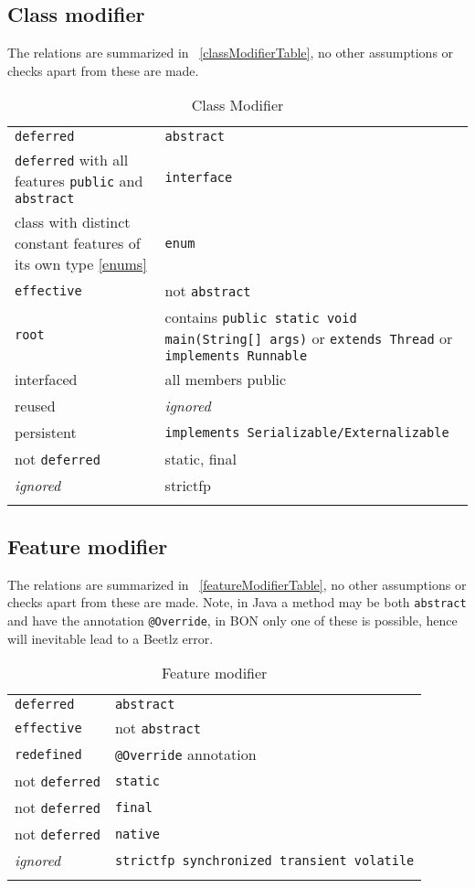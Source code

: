 \documentclass[11pt]{amsart}
\newcommand{\mytablebeg}{\begin{table}[h]\centering\begin{footnotesize}
\begin{tabular}{m{7cm}|m{7cm}} }
\newcommand{\mytableend}[2]{\end{tabular}\end{footnotesize}\caption{#1} \label{#2}\end{table}}
\newcommand{\simpleline}[2]{#1 & #2\\ \hdashline}
\begin{document}
\subsection{Class modifier}\hfill \newline
The relations are summarized in ~\autoref{classModifierTable}, no other assumptions or checks apart from these are made.
\mytablebeg
\simpleline{\texttt{deferred}}{\texttt{abstract}}
\simpleline{\texttt{deferred} \newline with all features \texttt{public} and \texttt{abstract}}{\texttt{interface}}
\simpleline{class with distinct constant features of its own type \ref{enums}}{\texttt{enum}}
\simpleline{\texttt{effective}}{not \texttt{abstract}}
\simpleline{\texttt{root}}{contains \texttt{public static void main(String[] args)} or \texttt{extends Thread} or \texttt{implements Runnable}}
\simpleline{interfaced}{all members public}
\simpleline{reused}{\emph{ignored}}
\simpleline{persistent}{\texttt{implements Serializable/Externalizable}}
\simpleline{not \texttt{deferred}}{static, final}
\simpleline{\emph{ignored}}{strictfp}
\mytableend{Class Modifier}{classModifierTable}


\subsection{Feature modifier}\hfill \newline
The relations are summarized in ~\autoref{featureModifierTable}, no other assumptions or checks apart from these are made. Note, in Java a method may be both \texttt{abstract} and have the annotation \texttt{@Override}, in BON only one of these is possible, hence will inevitable lead to a Beetlz error.
\mytablebeg
\simpleline{\texttt{deferred}}{\texttt{abstract}}
\simpleline{\texttt{effective}}{not \texttt{abstract}}
\simpleline{\texttt{redefined}}{\texttt{@Override} annotation}
\simpleline{not \texttt{deferred}}{\texttt{static}}
\simpleline{not \texttt{deferred}}{\texttt{final}}
\simpleline{not \texttt{deferred}}{\texttt{native}}
\simpleline{\emph{ignored}}{\texttt{strictfp \newline synchronized \newline transient \newline volatile}}
\mytableend{Feature modifier}{featureModifierTable}
\end{document}
